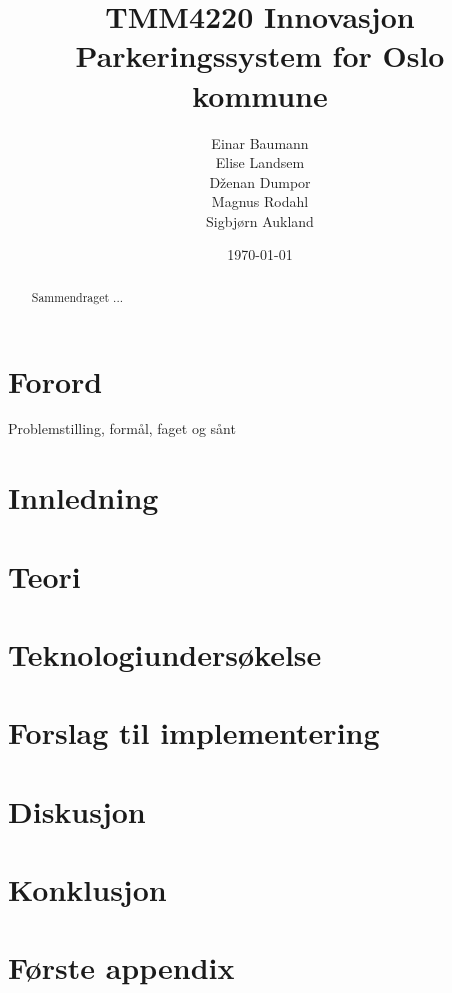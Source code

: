\documentclass[a4paper, norsk, 12pt]{article}
\title{TMM4220 Innovasjon \\ 
\vspace{6pt}\large Parkeringssystem for Oslo kommune \\ \vspace{50pt} 
 }
\author{Einar Baumann \\Elise Landsem\\D\v{z}enan Dumpor\\Magnus Rodahl\\Sigbjørn Aukland}
\date{\today}
\theoremstyle{remark}
\begin{document}
\maketitle
\thispagestyle{empty}
\vspace{50pt}
\begin{abstract}
Sammendraget ...
\end{abstract}
\pagebreak

\tableofcontents
\pagebreak

\section*{Forord}
Problemstilling, formål, faget og sånt
\pagebreak



\section{Innledning}
\label{sec:innledning}





\section{Teori}
\label{sec:teori}






\section{Teknologiundersøkelse}
\label{sec:teknologi}






\section{Forslag til implementering}
\label{sec:implementering}






\section{Diskusjon}
\label{sec:diskusjon}







\section{Konklusjon}
\label{sec:konklusjon}







\pagebreak
{}

\pagebreak




\appendix

\section{Første appendix}
\label{sec:}

\end{document}
